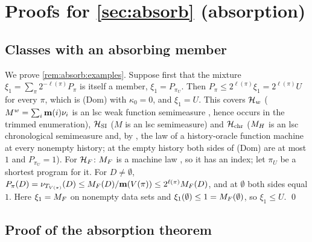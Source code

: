 \section{Proofs for \texorpdfstring{\cref{sec:absorb}}{Section \ref*{sec:absorb}} (absorption)}\label{app:absorb}

\subsection{Classes with an absorbing member}\label{app:absorb:examples}

We prove \cref{rem:absorb:examples}. Suppose first that the mixture $\xi_1=\sum_\pi2^{-\ell(\pi)}P_\pi$ is itself a member, $\xi_1=P_{\pi_U}$. Then $P_\pi\le2^{\ell(\pi)}\xi_1=2^{\ell(\pi)}U$ for every $\pi$, which is (Dom) with $\kappa_0=0$, and $\xi_1=U$. This covers $\mathcal{H}_{w}$ ($M^{w}=\sum_i\mathbf{m}(i)\nu_i$ is an lsc weak function semimeasure \citep[Theorem~3.11]{claudeSFI2026fundamentals}, hence occurs in the trimmed enumeration), $\mathcal{H}_{\mathrm{SI}}$ ($M$ is an lsc semimeasure) and $\mathcal{H}_{\mathrm{chr}}$ ($M_{H}$ is an lsc chronological semimeasure \citep[Corollary~6.17]{claudeSFI2026fundamentals} and, by \citet[Theorem~6.16]{claudeSFI2026fundamentals}, the law of a history-oracle function machine at every nonempty history; at the empty history both sides of (Dom) are at most $1$ and $P_{\pi_U}=1$). For $\mathcal{H}_{F}$: $M_{F}$ is a machine law \citep[Theorem~3.8]{claudeSFI2026fundamentals}, so it has an index; let $\pi_U$ be a shortest program for it. For $D\ne\emptyset$, $P_\pi(D)=\nu_{T_{V(\pi)}}(D)\le M_{F}(D)/\mathbf{m}(V(\pi))\le2^{\ell(\pi)}M_{F}(D)$, and at $\emptyset$ both sides equal $1$. Here $\xi_1=M_{F}$ on nonempty data sets and $\xi_1(\emptyset)\le1=M_{F}(\emptyset)$, so $\xi_1\le U$. \qed%

\subsection{Proof of the absorption theorem}\label{app:absorb:absorption}

